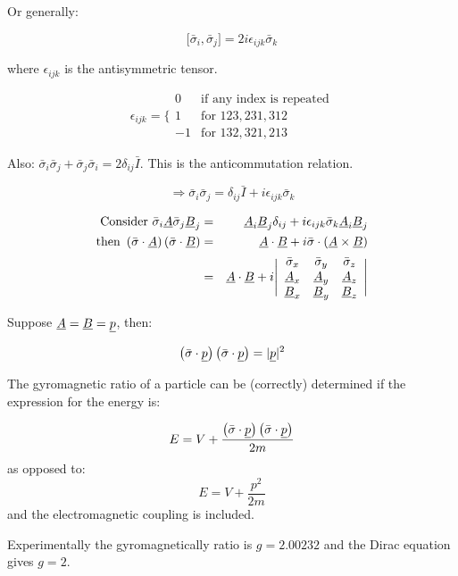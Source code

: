 Or generally:

\[
  \Big[\bar{\sigma}_i,\bar{\sigma}_j\Big] = 2i\epsilon_{ijk}\bar{\sigma}_k
\]

where $\epsilon_{ijk}$ is the antisymmetric tensor.

\[
  \epsilon_{ijk} = 
  \Bigg\{
    \begin{array}{cc}
    0  & \textrm{if any index is repeated} \\
    1  & \textrm{for } 123, 231, 312 \\
    -1 & \textrm{for } 132, 321, 213
    \end{array}
\]

Also: $\bar{\sigma}_i\bar{\sigma}_j + \bar{\sigma}_j\bar{\sigma}_i = 2\delta_{ij}\bar{I}$.  This is the anticommutation relation.

\[
  \Rightarrow \bar{\sigma}_i\bar{\sigma}_j = \delta_{ij} \bar{I} + i\epsilon_{ijk}\bar{\sigma}_k
\]

\begin{eqnarray*}
  \textrm{Consider }\bar{\sigma}_i\underline{A}\bar{\sigma}_j\underline{B}_j & = & \underline{A}_i\underline{B}_j\delta_{ij} + i\epsilon_{ijk}\bar{\sigma}_k\underline{A}_i\underline{B}_j \\
  \textrm{then } \left(\bar{\sigma}\cdot\underline{A}\right)\left(\bar{\sigma}\cdot\underline{B}\right) & = & \underline{A}\cdot\underline{B} + i\bar{\sigma}\cdot\left(\underline{A}\times\underline{B}\right) \\
  & = & \underline{A}\cdot\underline{B} + i
  \Bigg|
    \begin{array}{ccc}
    \bar{\sigma}_x  & \bar{\sigma}_y  & \bar{\sigma}_z  \\
    \underline{A}_x & \underline{A}_y & \underline{A}_z \\
    \underline{B}_x & \underline{B}_y & \underline{B}_z
    \end{array}
  \Bigg|
\end{eqnarray*}

Suppose $\underline{A} = \underline{B} = \underline{p}$, then:

\[
  \left(\bar{\sigma}\cdot\underline{p}\right)\left(\bar{\sigma}\cdot\underline{p}\right) = |\underline{p}|^2
\]

The gyromagnetic ratio of a particle can be (correctly) determined if the expression for the energy is:

\[
  E = V + \frac{\left(\bar{\sigma}\cdot\underline{p}\right)\left(\bar{\sigma}\cdot\underline{p}\right)}{2m}
\]
as opposed to:
\[
  E = V + \frac{p^2}{2m}
\]
and the electromagnetic coupling is included.

Experimentally the gyromagnetically ratio is $g = 2.00232$ and the Dirac equation gives $g = 2$.

